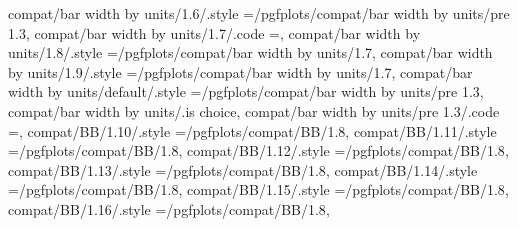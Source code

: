 {{{{{{{compat/bar width by units/1.6/.style                               ={/pgfplots/compat/bar width by units/pre 1.3},                                                                                    
compat/bar width by units/1.7/.code                                ={\def\b@pgfplots@compat@bar@width@units{0}},                                                                                      
compat/bar width by units/1.8/.style                               ={/pgfplots/compat/bar width by units/1.7},                                                                                         
compat/bar width by units/1.9/.style                               ={/pgfplots/compat/bar width by units/1.7},                                                                                         
compat/bar width by units/default/.style                           ={/pgfplots/compat/bar width by units/pre 1.3},                                                                                     
compat/bar width by units/.is choice,
compat/bar width by units/pre 1.3/.code                            ={\def\b@pgfplots@compat@bar@width@units{1}},                                                                                      
compat/BB/1.10/.style                                              ={/pgfplots/compat/BB/1.8},                                                                                                        
compat/BB/1.11/.style                                              ={/pgfplots/compat/BB/1.8},                                                                                                        
compat/BB/1.12/.style                                              ={/pgfplots/compat/BB/1.8},                                                                                                        
compat/BB/1.13/.style                                              ={/pgfplots/compat/BB/1.8},                                                                                                        
compat/BB/1.14/.style                                              ={/pgfplots/compat/BB/1.8},                                                                                                        
compat/BB/1.15/.style                                              ={/pgfplots/compat/BB/1.8},                                                                                                        
compat/BB/1.16/.style                                              ={/pgfplots/compat/BB/1.8},                                                                                                        
}}}}}}}
